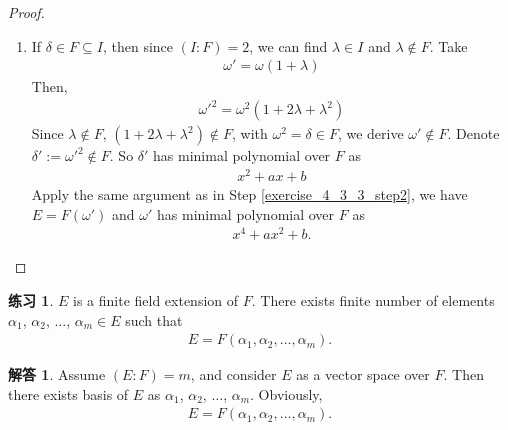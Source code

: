 \documentclass[utf8]{ctexbook}
\theoremstyle{definition}
\newtheorem{exercise}{练习}[section]
\newtheorem*{soln}{解答}
\begin{document}
\begin{proof}
\begin{itemize}
{\begin{enumerate}
{Since $(\theta + \dfrac{\beta}{2})^2 = \dfrac{\beta^2}{4} - \gamma$, which is $\\omega^2 = \delta $, the minimal polynomial of $\delta $ over $F$ shows $\omega^4 + a \omega^2 + b = 0$.

Notice $I = F(\delta)$ ({\color{red} by $\delta$ degree of $2$ over $F$?}), so $E = I(\omega)= F(\delta, \omega) = F(\omega)$ ({ \color{red} since $\delta$ is a polynomial of $\omega$, $\delta = \omega^2$?}).

By assumption, $(E:F)=4$, so $\omega$ has minimal polynomial over $F$ with degree of $4$, which is
\begin{align*}
x^4 + a x^2 + b
\end{align*}
}
\item{If $\delta \in F \subseteq I$, then since $(I:F)= 2$, we can find $\lambda \in I$ and $\lambda \not \in F$. Take
\begin{align*}
\omega' = \omega ( 1 + \lambda)
\end{align*}
Then,
\begin{align*}
\omega'^2 = \omega^2 ( 1+ 2 \lambda + \lambda^2 )
\end{align*}
Since $\lambda \not \in F$, $( 1+ 2 \lambda + \lambda^2 ) \not \in F$, with $\omega^2 = \delta \in F$, we derive $\omega' \not \in F$. Denote $\delta ' := \omega'^2 \not \in F$. So $\delta'$ has minimal polynomial over $F$ as
\begin{align*}
x^2 + a x + b
\end{align*}
Apply the same argument as in Step \ref{exercise_4_3_3_step2}, we have $E = F(\omega')$ and $\omega'$ has minimal polynomial over $F$ as
\begin{align*}
x^4 + ax^2 + b .
\end{align*}
}
\end{enumerate}
}
\end{itemize}
\end{proof}

\begin{exercise}
$E$ is a finite field extension of $F$. There exists finite number of elements $\alpha_1$, $\alpha_2$, $\ldots$, $\alpha_m \in E$ such that 
\begin{align*}
E = F(\alpha_1, \alpha_2, \ldots, \alpha_m ) .
\end{align*}
\end{exercise}

\begin{soln}
Assume $(E:F)=m$, and consider $E$ as a vector space over $F$. Then there exists basis of $E$ as $\alpha_1$, $\alpha_2$, $\ldots$, $\alpha_m$. Obviously,
\begin{align*}
E = F(\alpha_1, \alpha_2, \ldots, \alpha_m ) .
\end{align*}
\end{soln}
\end{document}
